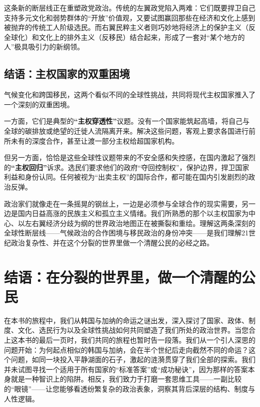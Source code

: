 \documentclass[a5paper, 11pt, openany]{ctexbook}
\begin{document}
这条新的断层线正在重塑政党政治。传统的左翼政党陷入两难：它们既要捍卫自己支持多元文化和弱势群体的“开放”价值观，又要试图赢回那些在经济和文化上感到被抛弃的传统工人阶级选民。而右翼民粹主义者则巧妙地将经济上的保护主义（反全球化）和文化上的排外主义（反移民）结合起来，形成了一套对“某个地方的人”极具吸引力的新纲领。

\section*{结语：主权国家的双重困境}

气候变化和跨国移民，这两个看似不同的全球性挑战，共同将现代主权国家推入了一个深刻的双重困境。

一方面，它们是典型的\textbf{“主权穿透性”}议题。没有一个国家能筑起高墙，将自己与全球的碳排放或绝望的迁徙人流隔离开来。解决这些问题，客观上要求各国进行前所未有的深度合作，甚至让渡一部分主权给超国家机构。

但另一方面，恰恰是这些全球性议题带来的不安全感和失控感，在国内激起了强烈的\textbf{“主权回归”}诉求。选民们要求他们的政府“夺回控制权”，保护边界，捍卫国家利益和身份认同。任何被视为“出卖主权”的国际合作，都可能在国内引发剧烈的政治反弹。

政治家们就像走在一条摇晃的钢丝上，一边是必须参与全球合作的现实需要，另一边是国内日益高涨的民族主义和孤立主义情绪。我们所熟悉的那个以主权国家为中心、以左右翼经济分歧为纲的世界政治地图正在被撕裂和重绘。理解这两条深刻的全球性断层线——气候政治的合作困境与移民政治的身份冲突——是我们理解21世纪政治复杂性、并在这个分裂的世界里做一个清醒公民的必经之路。

\chapter*{结语：在分裂的世界里，做一个清醒的公民}

在本书的旅程中，我们从韩国与加纳的命运之谜出发，深入探讨了国家、政体、制度、文化、选民行为以及全球性挑战如何共同塑造了我们所处的政治世界。当您合上这本书的最后一页时，我们共同的旅程也暂时告一段落。我们从一个引人深思的问题开始：为何起点相似的韩国与加纳，会在半个世纪后走向截然不同的命运？这个问题，如同一块投入平静湖面的石子，激起的涟漪贯穿了我们全部的探索。我们并未试图寻找一个适用于所有国家的“标准答案”或“成功秘诀”，因为那样的答案本身就是一种智识上的陷阱。相反，我们致力于打磨一套思维工具——一副比较的“眼镜”——让您能够看透纷繁复杂的政治表象，洞察其背后深层的结构、制度与人性逻辑。
\end{document}
